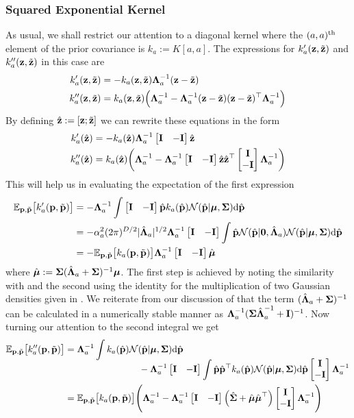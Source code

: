 \subsubsection{Squared Exponential Kernel}
As usual, we shall restrict our attention to a diagonal kernel where the $(a,a)^{\text{th}}$ element of the prior covariance is $k_a := K[a,a]$. The expressions for $k'_a(\mathbf{z},\tilde{\mathbf{z}})$ and $k''_a(\mathbf{z},\tilde{\mathbf{z}})$ in this case are
\begin{align*}
k'_a(\mathbf{z}, \tilde{\mathbf{z}}) &= - k_a(\mathbf{z},\tilde{\mathbf{z}}) \boldsymbol{\Lambda}_a^{-1} (\mathbf{z} - \tilde{\mathbf{z}}) \\
k''_a(\mathbf{z}, \tilde{\mathbf{z}}) &= k_a(\mathbf{z}, \tilde{\mathbf{z}})  \Big(\boldsymbol{\Lambda}_a^{-1}
- \boldsymbol{\Lambda}_a^{-1} (\mathbf{z} - \tilde{\mathbf{z}})(\mathbf{z} - \tilde{\mathbf{z}})^\top \boldsymbol{\Lambda}_a^{-1} \Big) 
\end{align*}
By defining $\hat{\mathbf{z}} := [\mathbf{z}; \tilde{\mathbf{z}}]$ we can rewrite these equations in the form
\begin{align*}
k'_a(\hat{\mathbf{z}}) &= - k_a(\hat{\mathbf{z}}) \boldsymbol{\Lambda}_a^{-1} \begin{bmatrix} \mathbf{I} & - \mathbf{I} \end{bmatrix} \hat{\mathbf{z}} \\
k''_a(\hat{\mathbf{z}}) &= k_a(\hat{\mathbf{z}})  \bigg(\boldsymbol{\Lambda}_a^{-1}
- \boldsymbol{\Lambda}_a^{-1} \begin{bmatrix} \mathbf{I} & - \mathbf{I} \end{bmatrix} \hat{\mathbf{z}}\hat{\mathbf{z}}^\top\begin{bmatrix} \mathbf{I} \\ - \mathbf{I} \end{bmatrix} \boldsymbol{\Lambda}_a^{-1} \bigg) 
\end{align*}
This will help us in evaluating the expectation of the first expression
\begin{align}
\nonumber \EE_{\bp,\tbp}\big[k'_a(\bp,\tbp)\big]
&= -  \bLa_a\inv  \int \bmat{\bI & -\bI}\hbp k_a(\hbp) \cN(\hbp | \bm, \bS) \dd \hbp \\
%
\nonumber &=  - \alpha_{a}^2 (2\pi)^{D/2}|\hat\bLa_{a}|^{1/2} \bLa_a\inv \bmat{\bI & -\bI}
\int \hbp \cN(\hbp|\bO, \hat\bLa_{a}) \cN(\hbp | \bm, \bS) \dd \hbp \\
%
&= - \EE_{\bp,\tbp}\big[k_a(\bp,\tbp)\big]  \bLa_a\inv \bmat{\bI & -\bI} \hat\bm
\end{align}
where $\hat{\boldsymbol{\mu}} := \boldsymbol{\Sigma}(\hat{\boldsymbol{\Lambda}}_a+\boldsymbol{\Sigma})^{-1}\boldsymbol{\mu}$. The first step is achieved by noting the similarity with  and the second using the identity for the multiplication of two Gaussian densities given in . We reiterate from our discussion of  that the term $(\hat{\boldsymbol{\Lambda}}_{a} + \boldsymbol{\Sigma})^{-1}$ can be calculated in a numerically stable manner as $\boldsymbol{\Lambda}_a^{-1}(\boldsymbol{\Sigma}\hat{\boldsymbol{\Lambda}}_{a}^{-1} + \mathbf{I})^{-1}$. Now turning our attention to the second integral we get
\begin{align}
\nonumber \EE_{\bp,\tbp}\big[k''_a(\bp,\tbp)\big]
&= \bLa_a\inv  \int k_a(\hbp) \cN(\hbp | \bm, \bS) \dd \hbp \\[-0.2cm]
\nonumber& \qquad\qquad\qquad\qquad
- \bLa_a\inv \bmat{\bI & -\bI} \int \hbp\hbp\T k_a(\hbp) \cN(\hbp | \bm, \bS) \dd \hbp \bmat{\bI \\ -\bI} \bLa_a\inv \\
%
&=    \EE_{\bp,\tbp}\big[k_a(\bp,\tbp)\big] \Bigg(
 \bLa_a\inv - \bLa_a\inv \bmat{\bI & -\bI} \Big(
\hat\bS + \hat\bm \hat\bm\T
\Big)\bmat{\bI \\ -\bI} \bLa_a\inv 
\Bigg)
\end{align}
